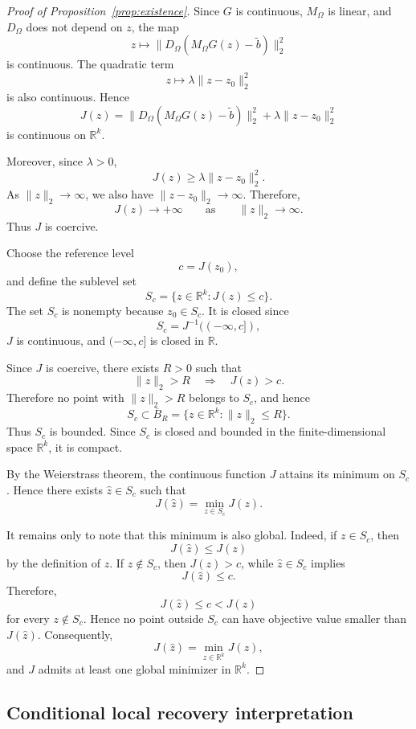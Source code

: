 \begin{proof}[Proof of Proposition~\ref{prop:existence}]
Since \(G\) is continuous, \(M_\Omega\) is linear, and \(D_\Omega\) does not
depend on \(z\), the map
\[
  z \mapsto \|D_\Omega(M_\Omega G(z)-\tilde b)\|_2^2
\]
is continuous. The quadratic term
\[
  z \mapsto \lambda\|z-z_0\|_2^2
\]
is also continuous. Hence
\[
  J(z)=\|D_\Omega(M_\Omega G(z)-\tilde b)\|_2^2+\lambda\|z-z_0\|_2^2
\]
is continuous on \(\mathbb{R}^k\).

Moreover, since \(\lambda>0\),
\[
  J(z)\geq \lambda\|z-z_0\|_2^2.
\]
As \(\|z\|_2\to\infty\), we also have \(\|z-z_0\|_2\to\infty\).
Therefore,
\[
  J(z)\to+\infty
  \qquad\text{as}\qquad
  \|z\|_2\to\infty.
\]
Thus \(J\) is coercive.

Choose the reference level
\[
  c=J(z_0),
\]
and define the sublevel set
\[
  S_c=\{z\in\mathbb{R}^k:J(z)\leq c\}.
\]
The set \(S_c\) is nonempty because \(z_0\in S_c\). It is closed since
\[
  S_c=J^{-1}((-\infty,c]),
\]
\(J\) is continuous, and \((-\infty,c]\) is closed in \(\mathbb{R}\).

Since \(J\) is coercive, there exists \(R>0\) such that
\[
  \|z\|_2>R
  \quad\Longrightarrow\quad
  J(z)>c.
\]
Therefore no point with \(\|z\|_2>R\) belongs to \(S_c\), and hence
\[
  S_c\subset \overline{B}_R
  =
  \{z\in\mathbb{R}^k:\|z\|_2\leq R\}.
\]
Thus \(S_c\) is bounded. Since \(S_c\) is closed and bounded in the
finite-dimensional space \(\mathbb{R}^k\), it is compact.

By the Weierstrass theorem, the continuous function \(J\) attains its minimum on
\(S_c\). Hence there exists \(\hat z\in S_c\) such that
\[
  J(\hat z)=\min_{z\in S_c}J(z).
\]

It remains only to note that this minimum is also global. Indeed, if
\(z\in S_c\), then
\[
  J(\hat z)\leq J(z)
\]
by the definition of \(\hat z\). If \(z\notin S_c\), then \(J(z)>c\), while
\(\hat z\in S_c\) implies
\[
  J(\hat z)\leq c.
\]
Therefore,
\[
  J(\hat z)\leq c < J(z)
\]
for every \(z\notin S_c\). Hence no point outside \(S_c\) can have objective
value smaller than \(J(\hat z)\). Consequently,
\[
  J(\hat z)=\min_{z\in\mathbb{R}^k}J(z),
\]
and \(J\) admits at least one global minimizer in \(\mathbb{R}^k\).
\end{proof}

\subsection{Conditional local recovery interpretation}
\label{app:conditional_local_recovery}
\label{app:oracle_bound}

